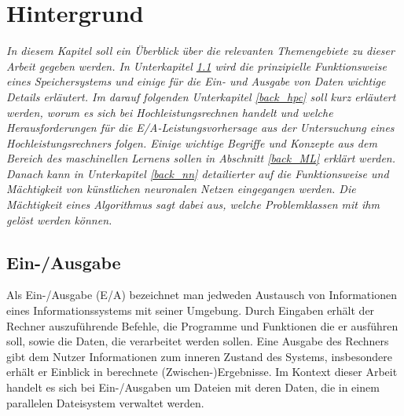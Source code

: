 \documentclass[
	12pt,
	a4paper,
	BCOR10mm,
	DIV14,
	listof=totoc,
	bibliography=totoc,
	headsepline
]{scrreprt}
\begin{document}
\chapter{Hintergrund}
\label{Hintergrund}
\textit{
	In diesem Kapitel soll ein Überblick über die relevanten Themengebiete zu dieser Arbeit gegeben werden.
	In Unterkapitel \ref{back_E/A} wird die prinzipielle Funktionsweise eines Speichersystems und einige für die Ein- und Ausgabe von Daten wichtige Details erläutert.
	Im darauf folgenden Unterkapitel \ref{back_hpc} soll kurz erläutert werden, worum es sich bei Hochleistungsrechnen handelt und welche Herausforderungen für die E/A-Leistungsvorhersage aus der Untersuchung eines Hochleistungsrechners folgen.
	Einige wichtige Begriffe und Konzepte aus dem Bereich des maschinellen Lernens sollen in Abschnitt \ref{back_ML} erklärt werden.
	Danach kann in Unterkapitel \ref{back_nn} detailierter auf die Funktionsweise und Mächtigkeit von künstlichen neuronalen Netzen eingegangen werden. Die Mächtigkeit eines Algorithmus sagt dabei aus, welche Problemklassen mit ihm gelöst werden können. 
}
\bigskip

\section{Ein-/Ausgabe}
\label{back_E/A}
Als Ein-/Ausgabe (E/A) bezeichnet man jedweden Austausch von Informationen eines Informationssystems mit seiner Umgebung. Durch Eingaben erhält der Rechner auszuführende Befehle, die Programme und Funktionen die er ausführen soll, sowie die Daten, die verarbeitet werden sollen.
Eine Ausgabe des Rechners gibt dem Nutzer Informationen zum inneren Zustand des Systems, insbesondere erhält er Einblick in berechnete (Zwischen-)Ergebnisse.  
Im Kontext dieser Arbeit handelt es sich bei Ein-/Ausgaben um Dateien mit deren Daten, die in einem parallelen Dateisystem verwaltet werden.
\medskip
\end{document}

